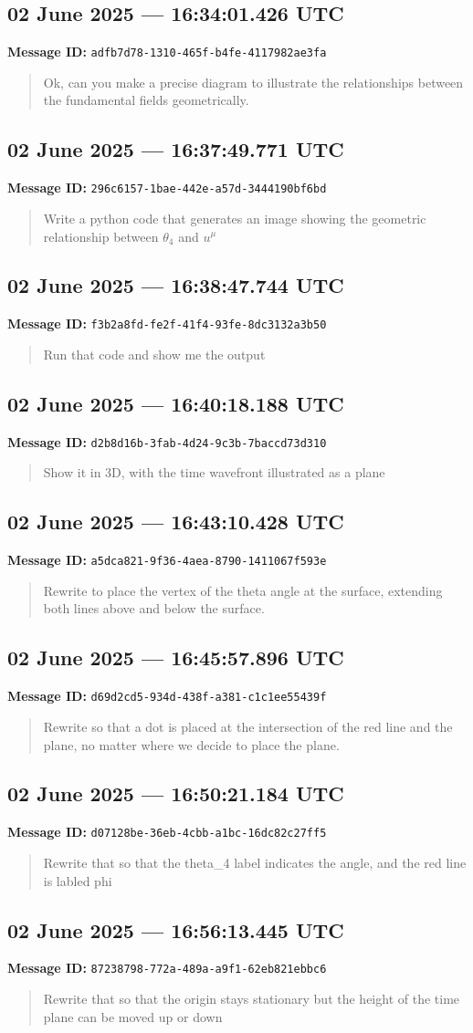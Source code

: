 \documentclass[11pt,letterpaper]{article}
\newcommand{\messageentry}[3]{%
  \Needspace{7\baselineskip}
  \subsection*{#1}
  {\small\textbf{Message ID:} \texttt{#2}}
  \vspace{2pt}
}
\begin{document}
\messageentry{02 June 2025 --- 16:34:01.426 UTC}{adfb7d78-1310-465f-b4fe-4117982ae3fa}{}
\begin{quote}\small
Ok, can you make a precise diagram to illustrate the relationships between the fundamental fields geometrically. 
\end{quote}

\messageentry{02 June 2025 --- 16:37:49.771 UTC}{296c6157-1bae-442e-a57d-3444190bf6bd}{}
\begin{quote}\small
Write a python code that generates an image showing the geometric relationship between \(\theta_4\) and \(u^\mu\)
\end{quote}

\messageentry{02 June 2025 --- 16:38:47.744 UTC}{f3b2a8fd-fe2f-41f4-93fe-8dc3132a3b50}{}
\begin{quote}\small
Run that code and show me the output
\end{quote}

\messageentry{02 June 2025 --- 16:40:18.188 UTC}{d2b8d16b-3fab-4d24-9c3b-7baccd73d310}{}
\begin{quote}\small
Show it in 3D, with the time wavefront illustrated as a plane
\end{quote}

\messageentry{02 June 2025 --- 16:43:10.428 UTC}{a5dca821-9f36-4aea-8790-1411067f593e}{}
\begin{quote}\small
Rewrite to place the vertex of the theta angle at the surface, extending both lines above and below the surface. 
\end{quote}

\messageentry{02 June 2025 --- 16:45:57.896 UTC}{d69d2cd5-934d-438f-a381-c1c1ee55439f}{}
\begin{quote}\small
Rewrite so that a dot is placed at the intersection of the red line and the plane, no matter where we decide to place the plane.
\end{quote}

\messageentry{02 June 2025 --- 16:50:21.184 UTC}{d07128be-36eb-4cbb-a1bc-16dc82c27ff5}{}
\begin{quote}\small
Rewrite that so that the theta\_4 label indicates the angle, and the red line is labled phi
\end{quote}

\messageentry{02 June 2025 --- 16:56:13.445 UTC}{87238798-772a-489a-a9f1-62eb821ebbc6}{}
\begin{quote}\small
Rewrite that so that the origin stays stationary but the height of the time plane can be moved up or down
\end{quote}
\end{document}
